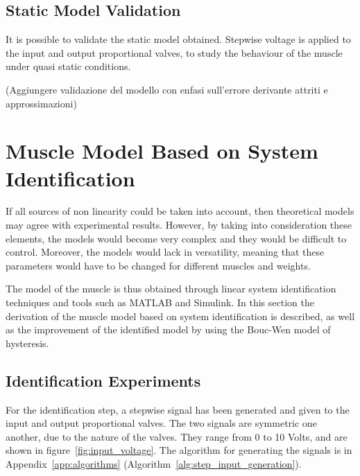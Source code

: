 \subsection{Static Model Validation}


It is possible to validate the static model obtained. Stepwise voltage is applied
to the input and output proportional valves, to study the behaviour of the muscle
under quasi static conditions.

{\color{red}(Aggiungere validazione del modello con enfasi sull'errore derivante attriti e approssimazioni)}

\clearpage

\section{Muscle Model Based on System Identification}

If all sources of non linearity could be taken into account,
then theoretical models may agree with experimental results.
However, by taking into consideration these elements, the models would become
very complex and they would be difficult to control. 
Moreover, the models would lack in versatility, meaning that these parameters
would have to be changed for different muscles and weights.

The model of the muscle is thus obtained through
linear system identification techniques and tools such as MATLAB and Simulink.
In this section the derivation of the muscle model based on system identification
is described, as well as the improvement of the identified model
by using the Bouc-Wen model of hysteresis.


\subsection{Identification Experiments}

For the identification step, a stepwise signal has been generated
and given to the input and output proportional valves. The two signals are symmetric
one another, due to the nature of the valves. They range from 0 to 10 Volts,
and are shown in figure~\ref{fig:input_voltage}. The algorithm for generating the signals
is in Appendix~\ref{app:algorithms} (Algorithm~\ref{alg:step_input_generation}).

